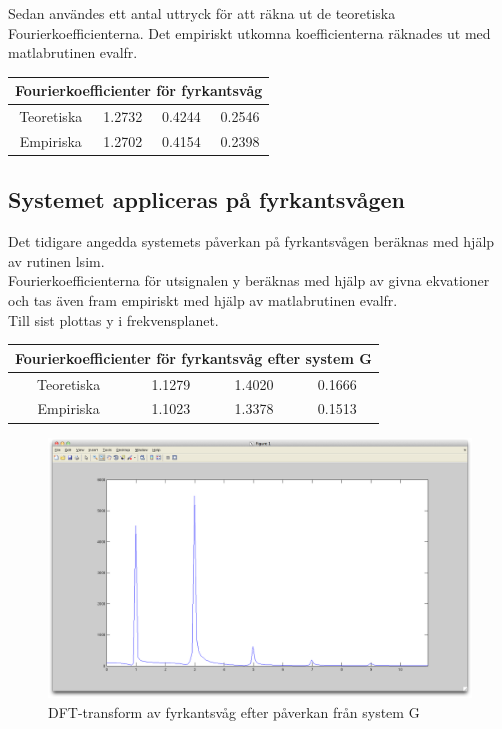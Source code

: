 \documentclass[]{article}
\begin{document}
Sedan användes ett antal uttryck för att räkna ut de teoretiska Fourierkoefficienterna. Det empiriskt utkomna koefficienterna räknades ut med matlabrutinen evalfr. \\

\begin{tabular}{|c||ccc|}
  \hline
  \multicolumn{4}{|c|}{Fourierkoefficienter för fyrkantsvåg} \\
  \hline
  Teoretiska & 1.2732 & 0.4244 & 0.2546\\
  \hline
  Empiriska & 1.2702 & 0.4154 & 0.2398\\
  \hline
\end{tabular}
\subsection{Systemet appliceras på fyrkantsvågen} %
\label{sub:systemet_appliceras_pa_fyrkantsvagen}
Det tidigare angedda systemets påverkan på fyrkantsvågen beräknas med hjälp av rutinen lsim.\\
Fourierkoefficienterna för utsignalen y beräknas med hjälp av givna ekvationer och tas även fram empiriskt med hjälp av matlabrutinen evalfr. \\
Till sist plottas y i frekvensplanet. \\
\begin{tabular}{|c||ccc|}
  \hline
  \multicolumn{4}{|c|}{Fourierkoefficienter för fyrkantsvåg efter system G} \\
  \hline
  Teoretiska & 1.1279 & 1.4020 & 0.1666\\
  \hline
  Empiriska & 1.1023 & 1.3378 & 0.1513\\
  \hline
\end{tabular}
\begin{figure}[htb]
  \centering
  \includegraphics[width=15.0cm]{dftY.png}
  \caption{DFT-transform av fyrkantsvåg efter påverkan från system G}
\end{figure}


\end{document}
